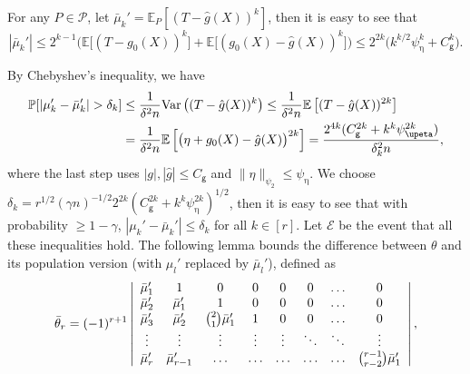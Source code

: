 \documentclass{article}
\def\gE{{\mathcal{E}}}
\def\gP{{\mathcal{P}}}
\newcommand{\E}{\mathbb{E}}
\begin{document}
For any $P\in\gP$, let $\bar{\mu}_k' = \E_{P}[(T-\hat{g}(X))^k]$, then it is easy to see that
\begin{equation}
    \label{mu-k-bar-bound}
    |\bar{\mu}_k'| \leq 2^{k-1} \big(\E\big[(T-g_0(X))^k\big] + \E\big[(g_0(X)-\hat{g}(X))^k\big]\big) \leq 2^{2k} \big(k^{k/2}\psi_{\upeta}^k + C_{\mathsf{g}}^k\big).
\end{equation}

By Chebyshev's inequality, we have
\begin{equation}
    \notag
    \begin{aligned}
    \mathbb{P}[|\mu_k'-\bar{\mu}_k'|>\delta_k] &\leq \frac{1}{\delta^2 n} \mathrm{Var}\left((T-\hat{g}(X))^k\right) \leq \frac{1}{\delta^2 n} \E\left[ (T-\hat{g}(X))^{2k} \right] \\
    &= \frac{1}{\delta^2 n} \E\left[ \big(\eta+g_0(X)-\hat{g}(X)\big)^{2k} \right] = \frac{2^{4k}(C_{\mathsf{g}}^{2k}+k^{k}\psi_{\upeta}^{2k})}{\delta_k^2 n},
    \end{aligned}
\end{equation}
where the last step uses $|g|,|\hat{g}|\leq C_{\mathsf{g}}$ and $\|\eta\|_{\psi_2} \leq \psi_{\upeta}$.
We choose $\delta_k = r^{1/2}(\gamma n)^{-1/2} 2^{2k}(C_{\mathsf{g}}^{2k}+k^{k}\psi_{\upeta}^{2k})^{1/2} $, then it is easy to see that with probability $\geq 1-\gamma$, $|\mu_k'-\bar{\mu}_k'| \leq \delta_k$ for all $k\in[r]$. Let $\gE$ be the event that all these inequalities hold. The following lemma bounds the difference between $\theta$ and its population version (with $\mu_l'$ replaced by $\bar{\mu}_l'$), defined as
\begin{equation}
    \notag
    \bar{\theta}_r =(-1)^{r+1}\left|\begin{array}{cccccccc}
    \bar{\mu}_1^{\prime} & 1 & 0 & 0 & 0 & 0 & \ldots & 0 \\
    \bar{\mu}_2^{\prime} & \bar{\mu}_1^{\prime} & 1 & 0 & 0 & 0 & \ldots & 0 \\
    \bar{\mu}_3^{\prime} & \bar{\mu}_2^{\prime} & \binom{2}{1} \bar{\mu}_1^{\prime} & 1 & 0 & 0 & \ldots & 0 \\
    \vdots & \vdots & \vdots & \vdots & \vdots & \ddots & \ddots & \vdots \\
    \bar{\mu}_r^{\prime} & \bar{\mu}_{r-1}^{\prime} & \ldots & \ldots & \ldots & \ldots & \ldots & \binom{r-1}{r-2} \bar{\mu}_1^{\prime}
    \end{array}\right|,
\end{equation}
\end{document}

